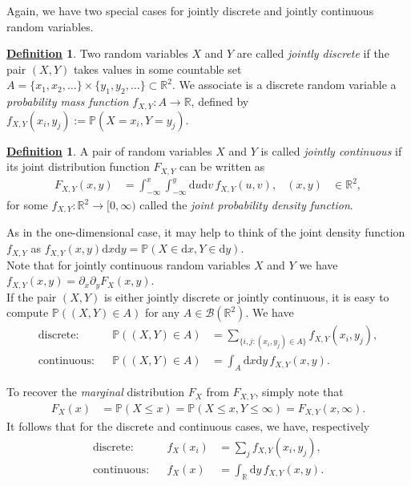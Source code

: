 \documentclass[12pt]{book}
\numberwithin{equation}{chapter}
\theoremstyle{plain}
\numberwithin{theorem}{section}
\theoremstyle{definition}
\newtheorem{definition}[theorem]{\underline{Definition}}
\numberwithin{exercise}{chapter}
\newcommand{\<}{\langle}
\renewcommand{\>}{\rangle}
\renewcommand{\(}{\left(}
\renewcommand{\)}{\right)}
\renewcommand{\[}{\left[}
\renewcommand{\]}{\right]}
\newcommand\Pb{\mathds{P}}
\newcommand\Rb{\mathds{R}}
\newcommand\Bc{\mathscr{B}}
\renewcommand\d{\partial}
\newcommand\dd{\mathrm{d}}
\begin{document}
\noindent
Again, we have two special cases for jointly discrete and jointly continuous random variables.

\begin{definition}
Two random variables $X$ and $Y$ are called \emph{jointly discrete} if the pair $(X,Y)$ takes values in some countable set $A = \{x_1,x_2,\ldots\} \times \{y_1,y_2,\ldots\} \subset \Rb^2$.  We associate is a discrete random variable a \emph{probability mass function} $f_{X,Y} : A \to \Rb$, defined by $f_{X,Y}(x_i,y_j) := \Pb( X = x_i, Y = y_j )$. 
\end{definition}

\begin{definition}
A pair of random variables $X$ and $Y$ is called \emph{jointly continuous} if its joint distribution function $F_{X,Y}$ can be written as
\begin{align}
F_{X,Y}(x,y)
	&=	\int_{-\infty}^x \int_{-\infty}^y \dd u \dd v \, f_{X,Y}(u,v) , &
(x,y)
	&\in \Rb^2 ,
\end{align}
for some $f_{X,Y} : \Rb^2 \to [0,\infty)$ called the \emph{joint probability density function}.
\end{definition}

\noindent
As in the one-dimensional case, it may help to think of the joint density function $f_{X,Y}$ as $f_{X,Y}(x,y) \dd x \dd y = \Pb( X \in \dd x , Y \in \dd y )$.
\\[0.5em]
Note that for jointly continuous random variables $X$ and $Y$ we have $f_{X,Y}(x,y) = \d_x\d_y F_X(x,y)$.
\\[0.5em]
If the pair $(X,Y)$ is either jointly discrete or jointly continuous, it is easy to compute $\Pb( (X,Y) \in A)$ for any $A \in \Bc(\Rb^2)$.  We have
\begin{align}
\text{discrete}:&&
\Pb( (X,Y) \in A)
	&=	\sum_{ \{i,j : (x_i,y_j) \in A \}} f_{X,Y}(x_i,y_j) , \\
\text{continuous}:&&
\Pb( (X,Y) \in A)
	&=	\int_A \dd x \dd y \, f_{X,Y}(x,y) .
\end{align}

\noindent
To recover the \emph{marginal} distribution $F_X$ from $F_{X,Y}$, simply note that
\begin{align}
F_X(x)
	&=	\Pb( X \leq x )
	=		\Pb( X \leq x, Y \leq \infty )
	=		F_{X,Y}(x,\infty) .
\end{align}
It follows that for the discrete and continuous cases, we have, respectively
\begin{align}
\text{discrete}:&&
f_X(x_i)
	&=	\sum_j f_{X,Y}(x_i,y_j) , \\
\text{continuous}:&&
f_X(x)
	&=	\int_\Rb \dd y \, f_{X,Y}(x,y) .
\end{align}
\end{document}
